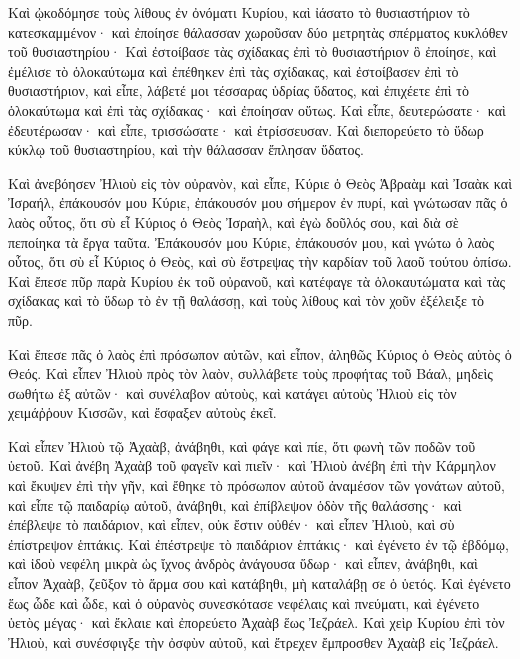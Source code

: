 {Καὶ ᾠκοδόμησε τοὺς λίθους ἐν ὀνόματι Κυρίου, καὶ ἰάσατο τὸ θυσιαστήριον τὸ κατεσκαμμένον· καὶ ἐποίησε θάλασσαν χωροῦσαν δύο μετρητὰς σπέρματος κυκλόθεν τοῦ θυσιαστηρίου·
Καὶ ἐστοίβασε τὰς σχίδακας ἐπὶ τὸ θυσιαστήριον ὃ ἐποίησε, καὶ ἐμέλισε τὸ ὁλοκαύτωμα καὶ ἐπέθηκεν ἐπὶ τὰς σχίδακας, καὶ ἐστοίβασεν ἐπὶ τὸ θυσιαστήριον,
καὶ εἶπε, λάβετέ μοι τέσσαρας ὑδρίας ὕδατος, καὶ ἐπιχέετε ἐπὶ τὸ ὁλοκαύτωμα καὶ ἐπὶ τὰς σχίδακας· καὶ ἐποίησαν οὕτως. Καὶ εἶπε, δευτερώσατε· καὶ ἐδευτέρωσαν· καὶ εἶπε, τρισσώσατε· καὶ ἐτρίσσευσαν.
Καὶ διεπορεύετο τὸ ὕδωρ κύκλῳ τοῦ θυσιαστηρίου, καὶ τὴν θάλασσαν ἔπλησαν ὕδατος.
\par }{\PP {}Καὶ ἀνεβόησεν Ἠλιοὺ εἰς τὸν οὐρανὸν, καὶ εἶπε, Κύριε ὁ Θεὸς Ἁβραὰμ καὶ Ἰσαὰκ καὶ Ἰσραήλ, ἐπάκουσόν μου Κύριε, ἐπάκουσόν μου σήμερον ἐν πυρί, καὶ γνώτωσαν πᾶς ὁ λαὸς οὗτος, ὅτι σὺ εἶ Κύριος ὁ Θεὸς Ἰσραὴλ, καὶ ἐγὼ δοῦλός σου, καὶ διὰ σὲ πεποίηκα τὰ ἔργα ταῦτα.
Ἐπάκουσόν μου Κύριε, ἐπάκουσόν μου, καὶ γνώτω ὁ λαὸς οὗτος, ὅτι σὺ εἶ Κύριος ὁ Θεὸς, καὶ σὺ ἔστρεψας τὴν καρδίαν τοῦ λαοῦ τούτου ὀπίσω.
Καὶ ἔπεσε πῦρ παρὰ Κυρίου ἐκ τοῦ οὐρανοῦ, καὶ κατέφαγε τὰ ὁλοκαυτώματα καὶ τὰς σχίδακας καὶ τὸ ὕδωρ τὸ ἐν τῇ θαλάσσῃ, καὶ τοὺς λίθους καὶ τὸν χοῦν ἐξέλειξε τὸ πῦρ.
\par }{\PP {}Καὶ ἔπεσε πᾶς ὁ λαὸς ἐπὶ πρόσωπον αὐτῶν, καὶ εἶπον, ἀληθῶς Κύριος ὁ Θεὸς αὐτὸς ὁ Θεός.
Καὶ εἶπεν Ἠλιοὺ πρὸς τὸν λαὸν, συλλάβετε τοὺς προφήτας τοῦ Βάαλ, μηδεὶς σωθήτω ἐξ αὐτῶν· καὶ συνέλαβον αὐτοὺς, καὶ κατάγει αὐτοὺς Ἠλιοὺ εἰς τὸν χειμάῤῥουν Κισσῶν, καὶ ἔσφαξεν αὐτοὺς ἐκεῖ.
\par }{\PP {}Καὶ εἶπεν Ἠλιοὺ τῷ Ἀχαὰβ, ἀνάβηθι, καὶ φάγε καὶ πίε, ὅτι φωνὴ τῶν ποδῶν τοῦ ὑετοῦ.
Καὶ ἀνέβη Ἀχαὰβ τοῦ φαγεῖν καὶ πιεῖν· καὶ Ἠλιοὺ ἀνέβη ἐπὶ τὴν Κάρμηλον καὶ ἔκυψεν ἐπὶ τὴν γῆν, καὶ ἔθηκε τὸ πρόσωπον αὐτοῦ ἀναμέσον τῶν γονάτων αὐτοῦ,
καὶ εἶπε τῷ παιδαρίῳ αὐτοῦ, ἀνάβηθι, καὶ ἐπίβλεψον ὁδὸν τῆς θαλάσσης· καὶ ἐπέβλεψε τὸ παιδάριον, καὶ εἶπεν, οὐκ ἔστιν οὐθέν· καὶ εἶπεν Ἠλιοὺ, καὶ σὺ ἐπίστρεψον ἑπτάκις.
Καὶ ἐπέστρεψε τὸ παιδάριον ἑπτάκις· καὶ ἐγένετο ἐν τῷ ἑβδόμῳ, καὶ ἰδοὺ νεφέλη μικρὰ ὡς ἴχνος ἀνδρὸς ἀνάγουσα ὕδωρ· καὶ εἶπεν, ἀνάβηθι, καὶ εἶπον Ἀχαὰβ, ζεῦξον τὸ ἅρμα σου καὶ κατάβηθι, μὴ καταλάβῃ σε ὁ ὑετός.
Καὶ ἐγένετο ἕως ὧδε καὶ ὧδε, καὶ ὁ οὐρανὸς συνεσκότασε νεφέλαις καὶ πνεύματι, καὶ ἐγένετο ὑετὸς μέγας· καὶ ἔκλαιε καὶ ἐπορεύετο Ἀχαὰβ ἕως Ἰεζράελ.
Καὶ χεὶρ Κυρίου ἐπὶ τὸν Ἠλιοὺ, καὶ συνέσφιγξε τὴν ὀσφὺν αὐτοῦ, καὶ ἔτρεχεν ἔμπροσθεν Ἀχαὰβ εἰς Ἰεζράελ.

}
